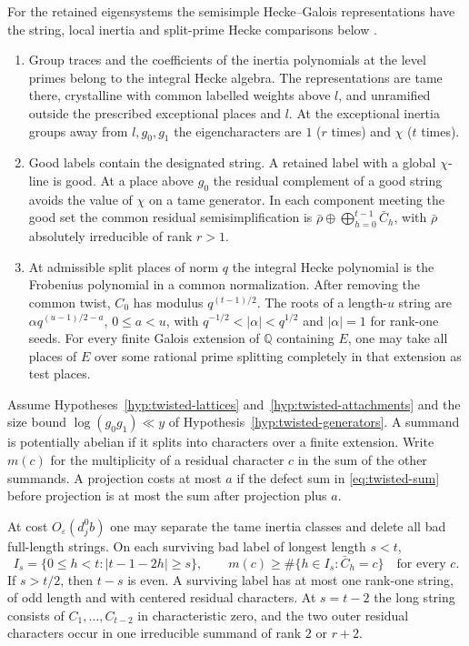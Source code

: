 \begin{hypothesis}[\openinput]\label{hyp:twisted-attachments}
For the retained eigensystems the semisimple Hecke--Galois
representations have the string, local inertia and split-prime Hecke
comparisons below \citep{nongenerator-note}.
\begin{enumerate}[label=\textup{(\roman*)},nosep]
\item Group traces and the coefficients of the inertia polynomials
at the level primes belong to the integral Hecke algebra. The
representations are tame there, crystalline with common labelled
weights above $l$, and unramified outside the prescribed exceptional
places and $l$. At the exceptional inertia groups away from $l,g_0,g_1$
the eigencharacters are $1$ ($r$ times) and $\chi$ ($t$ times).
\item Good labels contain the designated string. A retained label
with a global $\chi$-line is good. At a place above $g_0$ the residual
complement of a good string avoids the value of $\chi$ on a tame
generator. In each component meeting the good set the common residual
semisimplification is $\bar\rho\oplus\bigoplus_{h=0}^{t-1}\bar C_h$,
with $\bar\rho$ absolutely irreducible of rank $r>1$.
\item At admissible split places of norm $q$ the integral Hecke
polynomial is the Frobenius polynomial in a common normalization.
After removing the common twist, $C_0$ has modulus $q^{(t-1)/2}$.
The roots of a length-$u$ string are $\alpha q^{(u-1)/2-a}$,
$0\le a<u$, with $q^{-1/2}<|\alpha|<q^{1/2}$ and $|\alpha|=1$
for rank-one seeds. For every finite Galois extension of $\mathbb Q$
containing $E$, one may take all places of $E$ over some rational
prime splitting completely in that extension as test places.
\end{enumerate}
\end{hypothesis}

Assume Hypotheses~\ref{hyp:twisted-lattices}
and~\ref{hyp:twisted-attachments} and the size bound
$\log(g_0g_1)\ll y$ of Hypothesis~\ref{hyp:twisted-generators}.
A summand is potentially abelian if it splits into characters over a
finite extension. Write $m(c)$ for the multiplicity of a residual
character $c$ in the sum of the other summands. A projection costs
at most $a$ if the defect sum in \eqref{eq:twisted-sum} before projection
is at most the sum after projection plus $a$.

\begin{proposition}\label{prop:twisted-strings}
At cost $O_\varepsilon(d_j^0b)$ one may separate the tame inertia
classes and delete all bad full-length strings. On each surviving
bad label of longest length $s<t$,
\[
 I_s=\{0\le h<t:|t-1-2h|\ge s\},\qquad
 m(c)\ge\#\{h\in I_s:\bar C_h=c\}\quad\text{for every }c .
\]
If $s>t/2$, then $t-s$ is even. A surviving label has at most one
rank-one string, of odd length and with centered residual characters.
At $s=t-2$ the long string consists of $C_1,\ldots,C_{t-2}$ in
characteristic zero, and the two outer residual characters occur in
one irreducible summand of rank $2$ or $r+2$.
\end{proposition}

